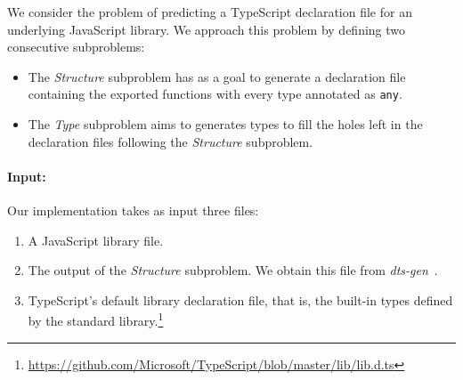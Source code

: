 \documentclass[sigplan,10pt,review,anonymous]{acmart} %
\theoremstyle{plain}
\theoremstyle{remark}
\theoremstyle{definition}
\begin{document}

We consider the problem of predicting a TypeScript declaration file
for an underlying JavaScript library. We approach this problem by defining
two consecutive subproblems:
\begin{itemize}[label=\raisebox{0.25ex}{\tiny$\bullet$}]
  \item The \textit{Structure} subproblem 
  has as a goal to generate a declaration file containing the exported functions with every type annotated as \texttt{any}.
  \item The \textit{Type} subproblem aims to generates types
  to fill the holes left in the declaration files
  following the \textit{Structure} subproblem.
\end{itemize}

\paragraph{Input:}
Our implementation takes as input three files:
\begin{enumerate}
	\item A JavaScript library file.
	\item The output of the \textit{Structure} subproblem.
	      We obtain this file from \textit{dts-gen}~\cite{dtsgen}.
	\item TypeScript's default library declaration file,
	      that is, the built-in types defined by the standard library.\footnote{\url{https://github.com/Microsoft/TypeScript/blob/master/lib/lib.d.ts}}
\end{enumerate}
%
\end{document}
